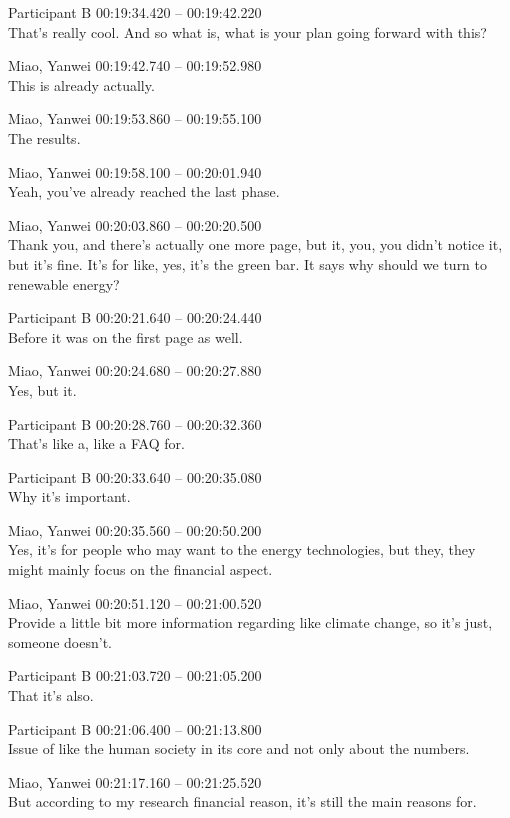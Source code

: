 {Participant B 00:19:34.420 -- 00:19:42.220 \\
That's really cool. And so what is, what is your plan going forward with this?

Miao, Yanwei 00:19:42.740 -- 00:19:52.980 \\
This is already actually.

Miao, Yanwei 00:19:53.860 -- 00:19:55.100 \\
The results.

Miao, Yanwei 00:19:58.100 -- 00:20:01.940 \\
Yeah, you've already reached the last phase.

Miao, Yanwei 00:20:03.860 -- 00:20:20.500 \\
Thank you, and there's actually one more page, but it, you, you didn't notice it, but it's fine. It's for like, yes, it's the green bar. It says why should we turn to renewable energy?

Participant B 00:20:21.640 -- 00:20:24.440 \\
Before it was on the first page as well.

Miao, Yanwei 00:20:24.680 -- 00:20:27.880 \\
Yes, but it.

Participant B 00:20:28.760 -- 00:20:32.360 \\
That's like a, like a FAQ for.

Participant B 00:20:33.640 -- 00:20:35.080 \\
Why it's important.

Miao, Yanwei 00:20:35.560 -- 00:20:50.200 \\
Yes, it's for people who may want to the energy technologies, but they, they might mainly focus on the financial aspect.

Miao, Yanwei 00:20:51.120 -- 00:21:00.520 \\
Provide a little bit more information regarding like climate change, so it's just, someone doesn't.

Participant B 00:21:03.720 -- 00:21:05.200 \\
That it's also.

Participant B 00:21:06.400 -- 00:21:13.800 \\
Issue of like the human society in its core and not only about the numbers.

Miao, Yanwei 00:21:17.160 -- 00:21:25.520 \\
But according to my research financial reason, it's still the main reasons for.

}
